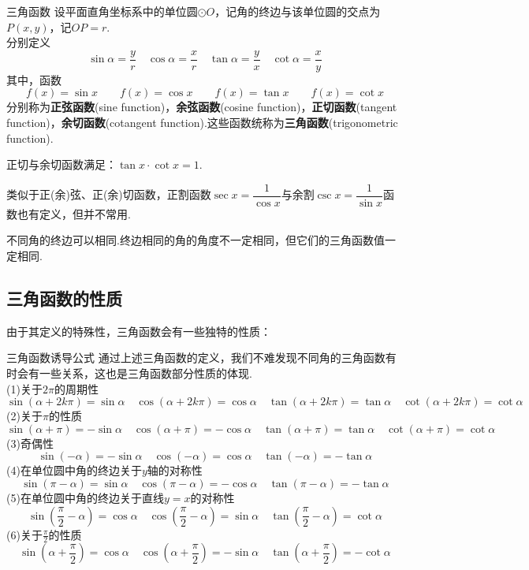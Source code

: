 \documentclass[lang=cn, zihao=5]{elegantbook}
\newcommand{\ssb}[1]{\left( #1 \right)}
\begin{document}
\begin{definition}{三角函数} %
    设平面直角坐标系中的单位圆$\odot O$，记角的终边与该单位圆的交点为$P(x,y)$，记$OP=r$.\\
    分别定义$$\sin{\alpha}=\frac{y}{r} \quad \cos{\alpha}=\frac{x}{r} \quad \tan{\alpha}=\frac{y}{x} \quad \cot{\alpha}=\frac{x}{y}$$
    其中，函数$$f(x)=\sin{x} \qquad f(x)=\cos{x} \qquad f(x)=\tan{x} \qquad f(x)=\cot{x}$$
    分别称为\textbf{正弦函数}(sine function)，\textbf{余弦函数}(cosine function)，\textbf{正切函数}(tangent function)，\textbf{余切函数}(cotangent function).这些函数统称为\textbf{三角函数}(trigonometric function).
\end{definition}
\begin{remark}
    正切与余切函数满足：$\tan{x} \cdot \cot{x} = 1$.
\end{remark}
\begin{remark}
    类似于正(余)弦、正(余)切函数，正割函数$\sec{x}=\dfrac{1}{\cos{x}}$与余割$\csc{x}=\dfrac{1}{\sin{x}}$函数也有定义，但并不常用.
\end{remark}
\begin{remark}
    不同角的终边可以相同.终边相同的角的角度不一定相同，但它们的三角函数值一定相同.
\end{remark}


\subsection{三角函数的性质}

由于其定义的特殊性，三角函数会有一些独特的性质：

\begin{proposition}{三角函数诱导公式} %
    通过上述三角函数的定义，我们不难发现不同角的三角函数有时会有一些关系，这也是三角函数部分性质的体现.\\
    (1)关于$2\pi$的周期性$$\sin{(\alpha + 2k\pi)}=\sin{\alpha} \quad \cos{(\alpha + 2k\pi)}=\cos{\alpha} \quad \tan{(\alpha + 2k\pi)}=\tan{\alpha} \quad \cot{(\alpha + 2k\pi)}=\cot{\alpha}$$
    (2)关于$\pi$的性质$$\sin{(\alpha + \pi)}=-\sin{\alpha} \quad \cos{(\alpha + \pi)}=-\cos{\alpha} \quad \tan{(\alpha + \pi)}=\tan{\alpha} \quad \cot{(\alpha + \pi)}=\cot{\alpha}$$
    (3)奇偶性$$\sin{(-\alpha)}=-\sin{\alpha} \quad \cos{(-\alpha)}=\cos{\alpha} \quad \tan{(-\alpha)}=-\tan{\alpha}$$
    (4)在单位圆中角的终边关于$y$轴的对称性$$\sin{(\pi - \alpha)} = \sin{\alpha} \quad \cos{(\pi - \alpha)} = -\cos{\alpha} \quad \tan{(\pi - \alpha)} = -\tan{\alpha}$$
    (5)在单位圆中角的终边关于直线$y=x$的对称性$$\sin{\ssb{\frac{\pi}{2}-\alpha}}=\cos{\alpha} \quad \cos{\ssb{\frac{\pi}{2}-\alpha}}=\sin{\alpha} \quad \tan{\ssb{\frac{\pi}{2}-\alpha}}=\cot{\alpha}$$
    (6)关于$\frac{\pi}{2}$的性质$$\sin{\ssb{\alpha+\frac{\pi}{2}}}=\cos{\alpha} \quad \cos{\ssb{\alpha+\frac{\pi}{2}}}=-\sin{\alpha} \quad \tan{\ssb{\alpha+\frac{\pi}{2}}}=-\cot{\alpha}$$
\end{proposition}
\end{document}
